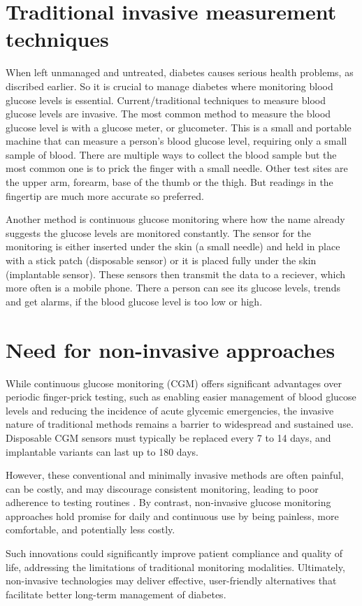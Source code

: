 \section{Traditional invasive measurement techniques}
\label{sec:Traditional invasive measurement techniques}
When left unmanaged and untreated, diabetes causes serious health problems, as discribed earlier. So it is crucial to manage diabetes where monitoring blood glucose 
levels is essential. Current/traditional techniques to measure blood glucose levels are invasive. The most common method to measure the blood glucose level is with a
glucose meter, or glucometer. This is a small and portable machine that can measure a person's blood glucose level, requiring only a small sample of blood. There are 
multiple ways to collect the blood sample but the most common one is to prick the finger with a small needle. Other test sites are the upper arm, forearm, base of the 
thumb or the thigh. But readings in the fingertip are much more accurate so preferred. \cite{ellis_blood_2024} 

Another method is continuous glucose monitoring where how
the name already suggests the glucose levels are monitored constantly. The sensor for the monitoring is either inserted under the skin (a small needle) and held in place
with a stick patch (disposable sensor) or it is placed fully under the skin (implantable sensor). These sensors then transmit the data to a reciever, which more often
is a mobile phone. There a person can see its glucose levels, trends and get alarms, if the blood glucose level is too low or high.\cite{wong_continuous_2023}

\section{Need for non-invasive approaches}
\label{sec:Need for non-invasive approaches}
While continuous glucose monitoring (CGM) offers significant advantages over periodic finger-prick testing, such as enabling easier management of blood glucose levels and 
reducing the incidence of acute glycemic emergencies, the invasive nature of traditional methods remains a barrier to widespread and sustained use. Disposable CGM 
sensors must typically be replaced every 7 to 14 days, and implantable variants can last up to 180 days.\cite{wong_continuous_2023}

However, these conventional and minimally invasive methods are often painful, can be costly, and may discourage consistent monitoring, leading to poor adherence to 
testing routines \cite{maldocsda_non-invasive_2024}. By contrast, non-invasive glucose monitoring approaches hold promise for daily and continuous use by being 
painless, more comfortable, and potentially less costly.

Such innovations could significantly improve patient compliance and quality of life, addressing the limitations of traditional monitoring modalities.
\cite{owida_non-invasive_2022, ghosh_evolution_2025} Ultimately, non-invasive technologies may deliver effective, user-friendly alternatives that facilitate 
better long-term management of diabetes.